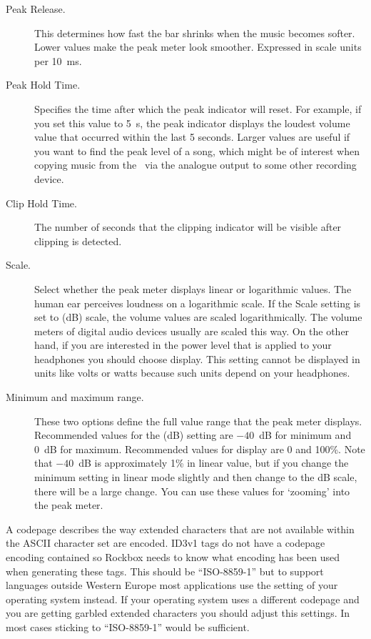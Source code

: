 \begin{description}
\begin{description}
    \item[Peak Release.]
      This determines how fast the bar shrinks when the music becomes
      softer. Lower values make the peak meter look smoother.
      Expressed in scale units per 10~ms.
    \item[Peak Hold Time.]
      Specifies the time after which the peak indicator will reset.
      For example, if you set this value to 5~s, the peak indicator displays
      the loudest volume value that occurred within the last 5 seconds.
      Larger values are useful if you want to find the peak level of a song,
      which might be of interest when copying music from the \dap\ via the
      analogue output to some other recording device.
    \item[Clip Hold Time.]
      The number of seconds that the clipping indicator will be visible
      after clipping is detected.
    \item[Scale.]
      Select whether the peak meter displays linear or logarithmic values.
      The human ear perceives loudness on a logarithmic scale. If the Scale
      setting is set to  (dB) scale, the volume values
      are scaled logarithmically. The volume meters of digital audio
      devices usually are scaled this way. On the other hand, if you
      are interested in the power level that is applied to your headphones
      you should choose  display. This setting cannot be
      displayed in units like volts or watts because such units depend
      on your headphones.
    \item[Minimum and maximum range.]
      These two options define the full value range that the peak meter
      displays. Recommended values for the  (dB) setting
      are $-40$~dB for minimum and 0~dB for maximum. Recommended values
      for  display are 0 and 100\%. Note that $-40$~dB is
      approximately 1\% in linear value, but if you change the minimum
      setting in linear mode slightly and then change to the dB scale,
      there will be a large change. You can use these values for `zooming'
      into the peak meter.
    \end{description}

    \item[Default Codepage.]
      A codepage describes the way extended characters that are not available
      within the ASCII character set are encoded. ID3v1 tags do not have a
      codepage encoding contained so Rockbox needs to know what encoding has
      been used when generating these tags. This should be ``ISO-8859-1'' but
      to support languages outside Western Europe most applications use
      the setting of your operating system instead. If your operating system
      uses a different codepage and you are getting garbled extended characters
      you should adjust this settings. In most cases sticking to
      ``ISO-8859-1'' would be sufficient.
  \end{description}

